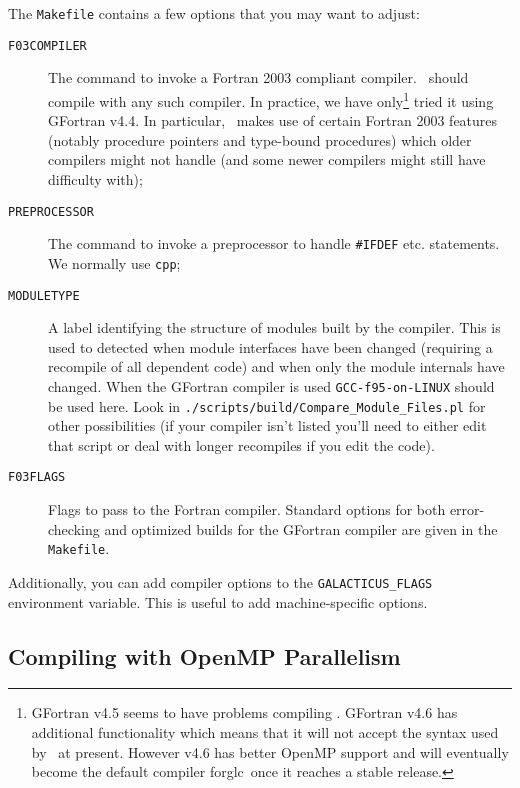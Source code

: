 The {\tt Makefile} contains a few options that you may want to adjust:
\begin{description}
 \item[{\tt F03COMPILER}] The command to invoke a Fortran 2003 compliant compiler. \glc\ should compile with any such compiler. In practice, we have only\footnote{{\sc GFortran} v4.5 seems to have problems compiling \glc. {\sc GFortran} v4.6 has additional functionality which means that it will not accept the syntax used by \glc\ at present. However v4.6 has better OpenMP support and will eventually become the default compiler forglc\ once it reaches a stable release.} tried it using {\sc GFortran} v4.4. In particular, \glc\ makes use of certain Fortran 2003 features (notably procedure pointers and type-bound procedures) which older compilers might not handle (and some newer compilers might still have difficulty with);
 \item[{\tt PREPROCESSOR}] The command to invoke a preprocessor to handle {\tt \#IFDEF} etc. statements. We normally use {\tt cpp};
 \item[{\tt MODULETYPE}] A label identifying the structure of modules built by the compiler. This is used to detected when module interfaces have been changed (requiring a recompile of all dependent code) and when only the module internals have changed. When the {\sc GFortran} compiler is used {\tt GCC-f95-on-LINUX} should be used here. Look in {\tt ./scripts/build/Compare\_Module\_Files.pl} for other possibilities (if your compiler isn't listed you'll need to either edit that script or deal with longer recompiles if you edit the code).
 \item[{\tt F03FLAGS}] Flags to pass to the Fortran compiler. Standard options for both error-checking and optimized builds for the {\sc GFortran} compiler are given in the {\tt Makefile}.
\end{description}
Additionally, you can add compiler options to the {\tt GALACTICUS\_FLAGS} environment variable. This is useful to add machine-specific options.

\subsection{Compiling with OpenMP Parallelism}

